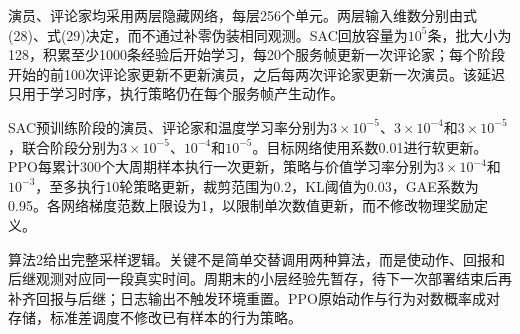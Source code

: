 演员、评论家均采用两层隐藏网络，每层256个单元。两层输入维数分别由式(28)、式(29)决定，而不通过补零伪装相同观测。SAC回放容量为$10^5$条，批大小为128，积累至少1000条经验后开始学习，每20个服务帧更新一次评论家；每个阶段开始的前100次评论家更新不更新演员，之后每两次评论家更新一次演员。该延迟只用于学习时序，执行策略仍在每个服务帧产生动作。

SAC预训练阶段的演员、评论家和温度学习率分别为$3\times10^{-5}$、$3\times10^{-4}$和$3\times10^{-5}$，联合阶段分别为$3\times10^{-5}$、$10^{-4}$和$10^{-5}$。目标网络使用系数0.01进行软更新。PPO每累计300个大周期样本执行一次更新，策略与价值学习率分别为$3\times10^{-4}$和$10^{-3}$，至多执行10轮策略更新，裁剪范围为0.2，KL阈值为0.03，GAE系数为0.95。各网络梯度范数上限设为1，以限制单次数值更新，而不修改物理奖励定义。

算法2给出完整采样逻辑。关键不是简单交替调用两种算法，而是使动作、回报和后继观测对应同一段真实时间。周期末的小层经验先暂存，待下一次部署结束后再补齐回报与后继；日志输出不触发环境重置。PPO原始动作与行为对数概率成对存储，标准差调度不修改已有样本的行为策略。


